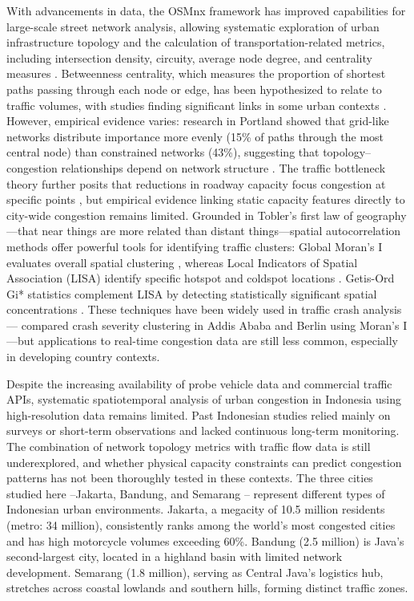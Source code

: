 \documentclass[review,authoryear]{elsarticle}
\begin{document}
With advancements in data, the OSMnx framework \citep{Boeing2017} has improved capabilities for large-scale street network analysis, allowing systematic exploration of urban infrastructure topology and the calculation of transportation-related metrics, including intersection density, circuity, average node degree, and centrality measures \citep{Boeing2025}. Betweenness centrality, which measures the proportion of shortest paths passing through each node or edge, has been hypothesized to relate to traffic volumes, with studies finding significant links in some urban contexts \citep{Gao2013,Porta2006}. However, empirical evidence varies: research in Portland showed that grid-like networks distribute importance more evenly (15\% of paths through the most central node) than constrained networks (43\%), suggesting that topology--congestion relationships depend on network structure \citep{Boeing2018,Kirkley2018}. The traffic bottleneck theory further posits that reductions in roadway capacity focus congestion at specific points \citep{Daganzo2007,Arnott1993}, but empirical evidence linking static capacity features directly to city-wide congestion remains limited. Grounded in Tobler's first law of geography \citep{Tobler1970}---that near things are more related than distant things---spatial autocorrelation methods offer powerful tools for identifying traffic clusters: Global Moran's I evaluates overall spatial clustering \citep{Moran1950}, whereas Local Indicators of Spatial Association (LISA) identify specific hotspot and coldspot locations \citep{Anselin1995}. Getis-Ord Gi* statistics complement LISA by detecting statistically significant spatial concentrations \citep{Getis1992,Ord1995}. These techniques have been widely used in traffic crash analysis---\citet{Gedamu2024} compared crash severity clustering in Addis Ababa and Berlin using Moran's I---but applications to real-time congestion data are still less common, especially in developing country contexts.

Despite the increasing availability of probe vehicle data and commercial traffic APIs, systematic spatiotemporal analysis of urban congestion in Indonesia using high-resolution data remains limited. Past Indonesian studies relied mainly on surveys or short-term observations and lacked continuous long-term monitoring. The combination of network topology metrics with traffic flow data is still underexplored, and whether physical capacity constraints can predict congestion patterns has not been thoroughly tested in these contexts. The three cities studied here --Jakarta, Bandung, and Semarang -- represent different types of Indonesian urban environments. Jakarta, a megacity of 10.5 million residents (metro: 34 million), consistently ranks among the world's most congested cities \citep{TomTom2023} and has high motorcycle volumes exceeding 60\%. Bandung (2.5 million) is Java's second-largest city, located in a highland basin with limited network development. Semarang (1.8 million), serving as Central Java's logistics hub, stretches across coastal lowlands and southern hills, forming distinct traffic zones.
\end{document}
